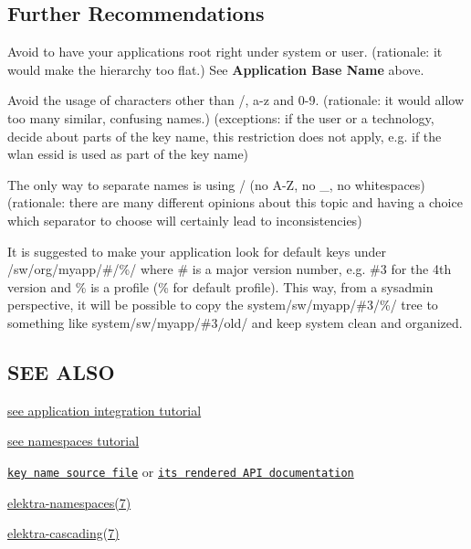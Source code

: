 \subsection*{Further Recommendations}


\begin{DoxyItemize}
\item Avoid to have your applications root right under {\ttfamily system} or {\ttfamily user}. (rationale\+: it would make the hierarchy too flat.) See {\bfseries Application Base Name} above.
\item Avoid the usage of characters other than {\ttfamily /}, a-\/z and 0-\/9. (rationale\+: it would allow too many similar, confusing names.) (exceptions\+: if the user or a technology, decide about parts of the key name, this restriction does not apply, e.\+g. if the wlan essid is used as part of the key name)
\item The only way to separate names is using {\ttfamily /} (no A-\/Z, no {\ttfamily \+\_\+}, no whitespaces) (rationale\+: there are many different opinions about this topic and having a choice which separator to choose will certainly lead to inconsistencies)
\item It is suggested to make your application look for default keys under {\ttfamily /sw/org/myapp/\#/\%/} where {\ttfamily \#} is a major version number, e.\+g. {\ttfamily \#3} for the 4th version and {\ttfamily \%} is a profile ({\ttfamily \%} for default profile). This way, from a sysadmin perspective, it will be possible to copy the {\ttfamily system/sw/myapp/\#3/\%/} tree to something like {\ttfamily system/sw/myapp/\#3/old/} and keep system clean and organized.
\end{DoxyItemize}

\subsection*{S\+EE A\+L\+SO}


\begin{DoxyItemize}
\item \hyperlink{doc_tutorials_application-integration_md}{see application integration tutorial}
\item \hyperlink{doc_tutorials_namespaces_md}{see namespaces tutorial}
\item \href{/home/markus/Projekte/Elektra/current/src/libs/elektra/keyname.c}{\tt key name source file} or \href{https://doc.libelektra.org/api/latest/html/group__keyname.html#details}{\tt its rendered A\+PI documentation}
\item \hyperlink{doc_help_elektra-namespaces_md}{elektra-\/namespaces(7)}
\item \hyperlink{doc_help_elektra-cascading_md}{elektra-\/cascading(7)} 
\end{DoxyItemize}